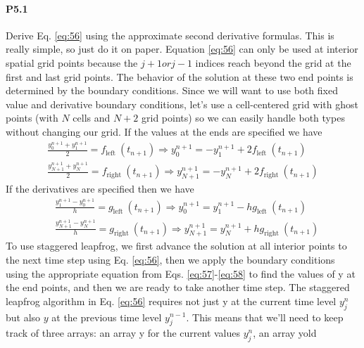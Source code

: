 \paragraph*{P5.1} Derive Eq. \eqref{eq:56} using the approximate second derivative formulas. This is
really simple, so just do it on paper.
Equation \eqref{eq:56} can only be used at interior spatial grid points because the
$ j + 1 {or} j-1$  indices reach beyond the grid at the first and last grid points. The
behavior of the solution at these two end points is determined by the boundary
conditions. Since we will want to use both fixed value and derivative boundary
conditions, let\rq s use a cell-centered grid with ghost points (with $N$ cells and $N+2$ grid points) so we can easily handle both types without changing our grid. If the values at the ends are specified we have 
\begin{equation}\label{eq:57}
\begin{gathered}
\frac{y_{0}^{n+1}+y_{1}^{n+1}}{2}=f_{\text {left }}\left(t_{n+1}\right) \Rightarrow y_{0}^{n+1}=-y_{1}^{n+1}+2 f_{\text {left }}\left(t_{n+1}\right) \\
\frac{y_{N+1}^{n+1}+y_{N}^{n+1}}{2}=f_{\text {right }}\left(t_{n+1}\right) \Rightarrow y_{N+1}^{n+1}=-y_{N}^{n+1}+2 f_{\text {right }}\left(t_{n+1}\right)
\end{gathered}
\end{equation}
If the derivatives are specified then we have
\begin{equation}\label{eq:58}
\begin{aligned}
&\frac{y_{1}^{n+1}-y_{0}^{n+1}}{h}=g_{\text {left }}\left(t_{n+1}\right) \Rightarrow y_{0}^{n+1}=y_{1}^{n+1}-h g_{\text {left }}\left(t_{n+1}\right) \\
&\frac{y_{N+1}^{n+1}-y_{N}^{n+1}}{h}=g_{\text {right }}\left(t_{n+1}\right) \Rightarrow y_{N+1}^{n+1}=y_{N}^{n+1}+h g_{\text {right }}\left(t_{n+1}\right)
\end{aligned}
\end{equation}
To use staggered leapfrog, we first advance the solution at all interior points to
the next time step using Eq. \eqref{eq:56}, then we apply the boundary conditions using
the appropriate equation from Eqs. \eqref{eq:57}-\eqref{eq:58} to find the values of y at the end
points, and then we are ready to take another time step.
The staggered leapfrog algorithm in Eq. \eqref{eq:56} requires not just y at the current
time level $ y_j^n$ but also $y$ at the previous time level $y^{n−1}_j$. This means that we\rq ll need
to keep track of three arrays: an array y for the current values $ y_j^n$, an array yold

